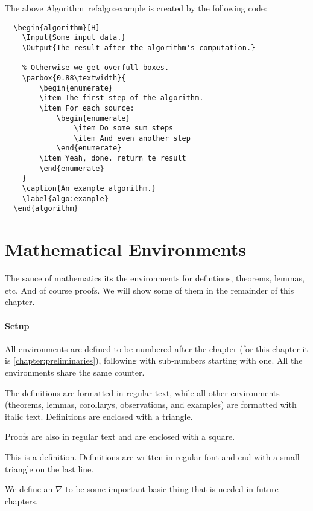 The above Algorithm~ref{algo:example} is created by the following code: 

\begin{lstlisting}
  \begin{algorithm}[H]
    \Input{Some input data.}
    \Output{The result after the algorithm's computation.}

    % Otherwise we get overfull boxes.
    \parbox{0.88\textwidth}{
        \begin{enumerate}
        \item The first step of the algorithm.
        \item For each source:
            \begin{enumerate}
                \item Do some sum steps
                \item And even another step
            \end{enumerate}
        \item Yeah, done. return te result
        \end{enumerate}
    }
    \caption{An example algorithm.}
    \label{algo:example}
  \end{algorithm}
\end{lstlisting}

\section{Mathematical Environments}

The sauce of mathematics its the environments for defintions, theorems, lemmas, etc. And of course proofs. We will show some of them in the remainder of this chapter.

\paragraph{Setup} All environments are defined to be numbered after the chapter (for this chapter it is \ref{chapter:preliminaries}), following with sub-numbers starting with one. All the environments share the same counter.

The definitions are formatted in regular text, while all other environments (theorems, lemmas, corollarys, observations, and examples) are formatted with italic text. Definitions are enclosed with a triangle.

Proofs are also in regular text and are enclosed with a square.

\begin{definition}\label{def:example}
  This is a definition. Definitions are written in regular font and end with a small triangle on the last line.
  
  We define an $\nabla$
 to be some important basic thing that is needed in future chapters.
\end{definition}

